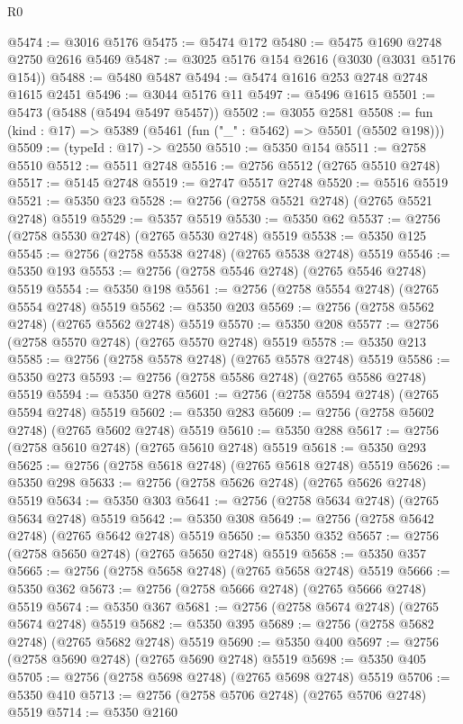 \begin{lexlean}{R0}
\begin{coremodule}
@5474 := @3016 @5176
@5475 := @5474 @172
@5480 := @5475 @1690 @2748 @2750 @2616 @5469
@5487 := @3025 @5176 @154 @2616 (@3030 (@3031 @5176 @154))
@5488 := @5480 @5487
@5494 := @5474 @1616 @253 @2748 @2748 @1615 @2451
@5496 := @3044 @5176 @11
@5497 := @5496 @1615
@5501 := @5473 (@5488 (@5494 @5497 @5457))
@5502 := @3055 @2581
@5508 := fun (kind : @17) => @5389 (@5461 (fun ("_" : @5462) => @5501 (@5502 @198)))
@5509 := (typeId : @17) -> @2550
@5510 := @5350 @154
@5511 := @2758 @5510
@5512 := @5511 @2748
@5516 := @2756 @5512 (@2765 @5510 @2748)
@5517 := @5145 @2748
@5519 := @2747 @5517 @2748
@5520 := @5516 @5519
@5521 := @5350 @23
@5528 := @2756 (@2758 @5521 @2748) (@2765 @5521 @2748) @5519
@5529 := @5357 @5519
@5530 := @5350 @62
@5537 := @2756 (@2758 @5530 @2748) (@2765 @5530 @2748) @5519
@5538 := @5350 @125
@5545 := @2756 (@2758 @5538 @2748) (@2765 @5538 @2748) @5519
@5546 := @5350 @193
@5553 := @2756 (@2758 @5546 @2748) (@2765 @5546 @2748) @5519
@5554 := @5350 @198
@5561 := @2756 (@2758 @5554 @2748) (@2765 @5554 @2748) @5519
@5562 := @5350 @203
@5569 := @2756 (@2758 @5562 @2748) (@2765 @5562 @2748) @5519
@5570 := @5350 @208
@5577 := @2756 (@2758 @5570 @2748) (@2765 @5570 @2748) @5519
@5578 := @5350 @213
@5585 := @2756 (@2758 @5578 @2748) (@2765 @5578 @2748) @5519
@5586 := @5350 @273
@5593 := @2756 (@2758 @5586 @2748) (@2765 @5586 @2748) @5519
@5594 := @5350 @278
@5601 := @2756 (@2758 @5594 @2748) (@2765 @5594 @2748) @5519
@5602 := @5350 @283
@5609 := @2756 (@2758 @5602 @2748) (@2765 @5602 @2748) @5519
@5610 := @5350 @288
@5617 := @2756 (@2758 @5610 @2748) (@2765 @5610 @2748) @5519
@5618 := @5350 @293
@5625 := @2756 (@2758 @5618 @2748) (@2765 @5618 @2748) @5519
@5626 := @5350 @298
@5633 := @2756 (@2758 @5626 @2748) (@2765 @5626 @2748) @5519
@5634 := @5350 @303
@5641 := @2756 (@2758 @5634 @2748) (@2765 @5634 @2748) @5519
@5642 := @5350 @308
@5649 := @2756 (@2758 @5642 @2748) (@2765 @5642 @2748) @5519
@5650 := @5350 @352
@5657 := @2756 (@2758 @5650 @2748) (@2765 @5650 @2748) @5519
@5658 := @5350 @357
@5665 := @2756 (@2758 @5658 @2748) (@2765 @5658 @2748) @5519
@5666 := @5350 @362
@5673 := @2756 (@2758 @5666 @2748) (@2765 @5666 @2748) @5519
@5674 := @5350 @367
@5681 := @2756 (@2758 @5674 @2748) (@2765 @5674 @2748) @5519
@5682 := @5350 @395
@5689 := @2756 (@2758 @5682 @2748) (@2765 @5682 @2748) @5519
@5690 := @5350 @400
@5697 := @2756 (@2758 @5690 @2748) (@2765 @5690 @2748) @5519
@5698 := @5350 @405
@5705 := @2756 (@2758 @5698 @2748) (@2765 @5698 @2748) @5519
@5706 := @5350 @410
@5713 := @2756 (@2758 @5706 @2748) (@2765 @5706 @2748) @5519
@5714 := @5350 @2160

\end{coremodule}
\end{lexlean}
